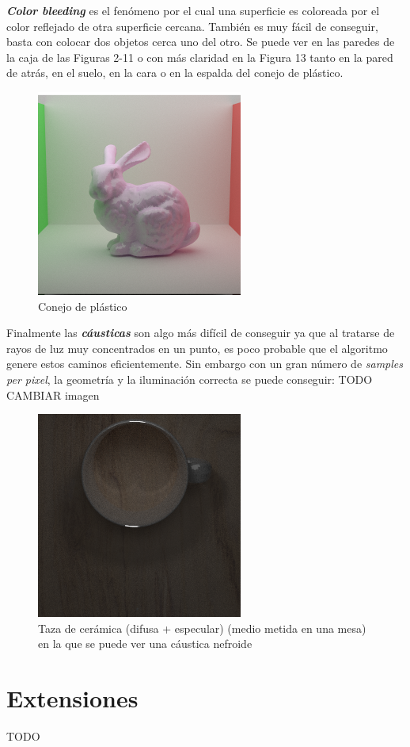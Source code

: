 \documentclass{article}
\begin{document}
\textbf{\textit{Color bleeding}} es el fenómeno por el cual una superficie es
coloreada por el color reflejado de otra superficie cercana. También es muy
fácil de conseguir, basta con colocar dos objetos cerca uno del otro. Se puede
ver en las paredes de la caja de las Figuras 2-11 o con más claridad en la
Figura 13 tanto en la pared de atrás, en el suelo, en la cara o en la espalda
del conejo de plástico. \\

\begin{figure}[H]
\centering
\includegraphics[width=0.6\linewidth]{imgs/plastic_bunny.png}
\caption{Conejo de plástico}
\end{figure}

Finalmente las \textbf{\textit{cáusticas}} son algo más difícil de conseguir ya
que al tratarse de rayos de luz muy concentrados en un punto, es poco probable
que el algoritmo genere estos caminos eficientemente. Sin embargo con un gran
número de \textit{samples per pixel}, la geometría y la iluminación correcta se
puede conseguir: TODO CAMBIAR imagen
\begin{figure}[H]
\centering
\includegraphics[width=0.6\linewidth]{imgs/nephroid.png}
\caption{Taza de cerámica (difusa + especular) (medio metida en una mesa) en la
  que se puede ver una cáustica nefroide}
\end{figure}

\section{Extensiones}
TODO
\end{document}
